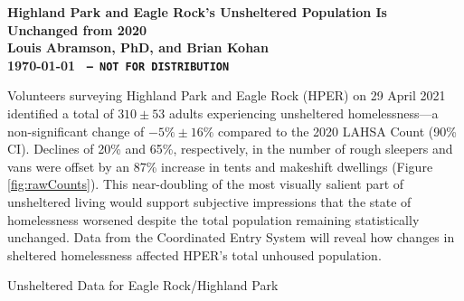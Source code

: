 \documentclass[11pt]{article}
\def\bfr{\bf\color{red}}
\def\resp{respectively}
\begin{document}

\begin{center}
	\Large\bf Highland Park and Eagle Rock's Unsheltered Population Is \\ Unchanged from 2020\\
	\vspace{1ex}
	{\normalsize\rm Louis Abramson, PhD, and Brian Kohan\\ \today 
	}{\bfr \texttt{ -- NOT FOR DISTRIBUTION}}
\end{center}

 Volunteers surveying Highland Park and Eagle Rock (HPER) on 29 April 2021 
identified a total of $310\pm53$ adults experiencing unsheltered homelessness---a non-significant change of
$-5\%\pm16\%$ compared to the 2020 LAHSA Count (90\% CI). Declines of 20\% and 65\%, \resp, in the 
number of rough sleepers and vans were offset by an 87\% increase in tents and makeshift dwellings 
(Figure \ref{fig:rawCounts}). This near-doubling of the most visually salient part of unsheltered 
living would support subjective impressions that the state of homelessness worsened despite the 
total population remaining statistically unchanged. Data from the Coordinated Entry System will 
reveal how changes in sheltered homelessness affected HPER's total unhoused population.

\begin{table}[h]
\caption{Unsheltered Data for Eagle Rock/Highland Park}
\caption*{*Neither the change in raw counts nor inferred population is statistically significant 
(parentheses denote 90\% uncertainties). No minors or families were sighted; two transition aged youth
are tallied as ``Persons,'' above.}
\label{tbl:summary}
\end{table}
\end{document}
